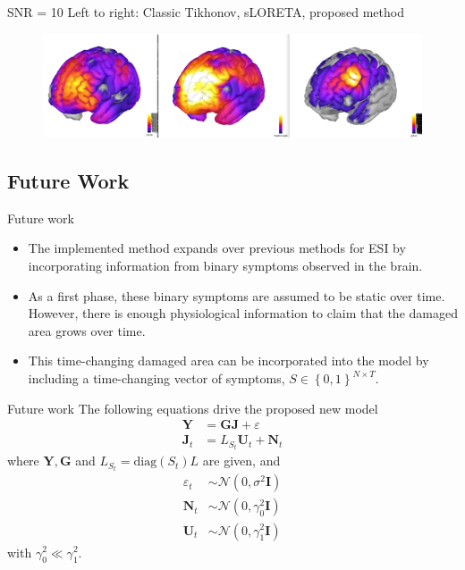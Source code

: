 \documentclass[progressbar=head]{beamer}
\newcommand{\set}[1]{ \left\{ #1 \right\} }
\newcommand{\ppar}[1]{ \left( #1 \right) }
\newcommand{\J}{\mathbf{J}}
\newcommand{\Y}{\mathbf{Y}}
\newcommand{\G}{\mathbf{G}}
\newcommand{\U}{\mathbf{U}}
\newcommand{\N}{\mathbf{N}}
\newcommand{\id}{\mathbf{I}}
\newcommand{\norm}{\mathcal{N}}
\begin{document}
\begin{frame}{SNR = 10}
Left to right: Classic Tikhonov, sLORETA, proposed method
\begin{figure}
\centering
\includegraphics[width=1\linewidth]{./img_oldbeamer/comparison1}
\end{figure}
\end{frame}


{
\subsection{Future Work}
}

\begin{frame}{Future work}
\begin{itemize}
    \item The implemented method expands over previous methods for ESI by incorporating information from binary symptoms observed in the brain.
    \item As a first phase, these binary symptoms are assumed to be static over time. However, there is enough physiological information to claim that the damaged area grows over time.
    \item This time-changing damaged area can be incorporated into the model by including a time-changing vector of symptoms, ${S\in \set{0,1}^{N\times T}}$.
\end{itemize}
\end{frame}

\begin{frame}{Future work}
The following equations drive the proposed new model
\begin{align}
    \Y &= \G \J + \varepsilon \\
    \J_t &=  L_{S_t} \U_t + \N_t
\end{align}
where $\Y, \G$ and $L_{S_t} = \text{diag}\ppar{S_t} L$ are given, and
\begin{align}
    \varepsilon_t &\sim  \norm\ppar{0, \sigma^2 \id } \\
    \N_t &\sim  
    \norm\ppar{0, \gamma_0^2 \id } \\
    \U_t &\sim  
    \norm\ppar{0, \gamma_1^2 \id } 
\end{align}
with $\gamma_0^2 \ll \gamma_1^2$.
\end{frame}
\end{document}
